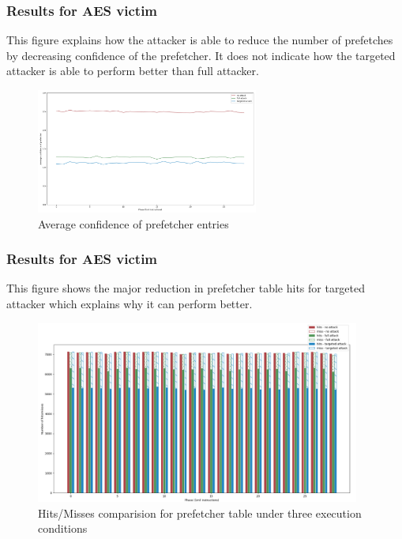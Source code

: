 \documentclass[10pt]{beamer}
\begin{document}
\begin{frame}
\frametitle{Results for AES victim}
This figure explains how the attacker is able to reduce the number of prefetches by decreasing
confidence of the prefetcher. It does not indicate how the targeted attacker is able to perform
better than full attacker.
\begin{figure}[ht]
    \centering
    \includegraphics[width=0.65\textwidth]{figures/avg_conf.png}
    \caption{Average confidence of prefetcher entries}
    \label{fig:prefetch_attack}
\end{figure}
\end{frame}


\begin{frame}
\frametitle{Results for AES victim}
This figure shows the major reduction in prefetcher table hits for targeted attacker which
explains why it can perform better.
\begin{figure}[ht]
    \centering
    \includegraphics[width=0.95\textwidth]{figures/pf_hits.png}
    \caption{Hits/Misses comparision for prefetcher table under three execution conditions}
\end{figure}
\end{frame}
\end{document}
